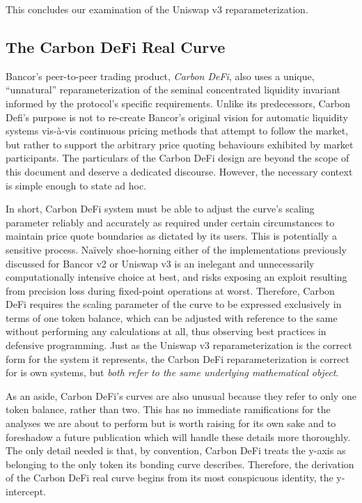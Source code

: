 \documentclass{article}
\begin{document}
This concludes our examination of the Uniswap v3 reparameterization. 

\subsection{The Carbon DeFi Real Curve}\label{subsec4.4}

Bancor’s peer-to-peer trading product, \textit{Carbon DeFi}, also uses a unique, “unnatural” reparameterization of the seminal concentrated liquidity invariant informed by the protocol’s specific requirements. Unlike its predecessors, Carbon Defi’s purpose is not to re-create Bancor’s original vision for automatic liquidity systems vis-à-vis continuous pricing methods that attempt to follow the market, but rather to support the arbitrary price quoting behaviours exhibited by market participants. The particulars of the Carbon DeFi design are beyond the scope of this document and deserve a dedicated discourse. However, the necessary context is simple enough to state ad hoc. 

In short, Carbon DeFi system must be able to adjust the curve’s scaling parameter reliably and accurately as required under certain circumstances to maintain price quote boundaries as dictated by its users. This is potentially a sensitive process. Naïvely shoe-horning either of the implementations previously discussed for Bancor v2 or Uniswap v3 is an inelegant and unnecessarily computationally intensive choice at best, and risks exposing an exploit resulting from precision loss during fixed-point operations at worst. Therefore, Carbon DeFi requires the scaling parameter of the curve to be expressed exclusively in terms of one token balance, which can be adjusted with reference to the same without performing any calculations at all, thus observing best practices in defensive programming. Just as the Uniswap v3 reparameterization is the correct form for the system it represents, the Carbon DeFi reparameterization is correct for is own systems, but \textit{both refer to the same underlying mathematical object}.

As an aside, Carbon DeFi’s curves are also unusual because they refer to only one token balance, rather than two. This has no immediate ramifications for the analyses we are about to perform but is worth raising for its own sake and to foreshadow a future publication which will handle these details more thoroughly. The only detail needed is that, by convention, Carbon DeFi treats the y-axis as belonging to the only token its bonding curve describes. Therefore, the derivation of the Carbon DeFi real curve begins from its most conspicuous identity, the y-intercept. 
\end{document}

